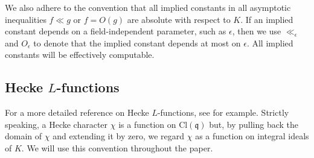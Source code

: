 \documentclass[12pt,psamsfonts]{amsart}
\theoremstyle{definition}
\theoremstyle{remark}
\numberwithin{equation}{section}
\theoremstyle{plain}
\theoremstyle{remark}
\renewcommand{\1}{ {\bf 1}}
\newcommand{\kq}{\mathfrak{q}}
\begin{document}
We also adhere to the convention that all implied constants in all asymptotic inequalities $f\ll g$ or $f=O(g)$ are absolute with respect to $K$.  If an implied constant depends on a field-independent parameter, such as $\epsilon$, then we use $\ll_{\epsilon}$ and $O_{\epsilon}$ to denote that the implied constant depends at most on $\epsilon$.  All implied constants will be effectively computable.


\subsection{Hecke $L$-functions}
For a more detailed reference on Hecke $L$-functions, see \cite{LO,Heilbronn} for example. Strictly speaking, a Hecke character $\chi$ is a function on $\mathrm{Cl}(\kq)$ but, by pulling back the domain of $\chi$ and extending it by zero, we regard $\chi$ as a function on integral ideals of $K$.  We will use this convention throughout the paper. 
\end{document}
